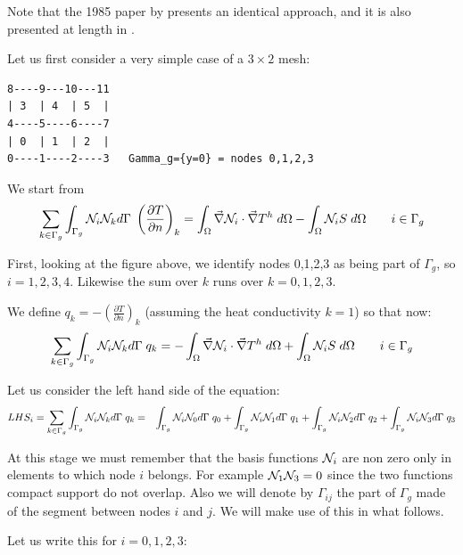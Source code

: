 Note that the 1985 paper by \textcite{cacs85} presents an identical approach, 
and it is also presented at length in \textcite{grls87}.

Let us first consider a very simple case of a $3\times 2$ mesh:

\begin{verbatim}
8----9---10---11
| 3  | 4  | 5  |
4----5----6----7
| 0  | 1  | 2  |
0----1----2----3   Gamma_g={y=0} = nodes 0,1,2,3
\end{verbatim}



We start from 
\begin{equation}
\sum_{k \in \Gamma_g} \int_{\Gamma_g} {\mathcal{N}}_i {\mathcal{N}}_k d\Gamma \; 
\left(
\frac{\partial T}{\partial n}
\right)_k
=
\int_\Omega \vec\nabla {\mathcal{N}}_i \cdot \vec\nabla T^h \; d\Omega
- \int_\Omega {\mathcal{N}}_i S \; d\Omega
\qquad
i \in \Gamma_g
\label{eq:mizu1}
\end{equation}

First, looking at the figure above, we identify nodes 0,1,2,3 as 
being part of $\Gamma_g$, so $i=1,2,3,4$. Likewise the sum over $k$ 
runs over $k=0,1,2,3$.

We define $q_k= -\left(\frac{\partial T}{\partial n}\right)_k$ 
(assuming the heat conductivity $k=1$) 
so that now:
\[
\sum_{k \in \Gamma_g} \int_{\Gamma_g} {\mathcal{N}}_i {\mathcal{N}}_k d\Gamma \; 
q_k
=
-\int_\Omega \vec\nabla {\mathcal{N}}_i \cdot \vec\nabla T^h \; d\Omega
+ \int_\Omega {\mathcal{N}}_i S \; d\Omega
\qquad
i \in \Gamma_g
\]


Let us consider the left hand side of the equation:
\begin{eqnarray}
LHS_i= \sum_{k \in \Gamma_g} \int_{\Gamma_g} {\mathcal{N}}_i {\mathcal{N}}_k d\Gamma \; q_k
&=&
\int_{\Gamma_g} {\mathcal{N}}_i {\mathcal{N}}_0 d\Gamma \; q_0 +
\int_{\Gamma_g} {\mathcal{N}}_i {\mathcal{N}}_1 d\Gamma \; q_1 +
\int_{\Gamma_g} {\mathcal{N}}_i {\mathcal{N}}_2 d\Gamma \; q_2 +
\int_{\Gamma_g} {\mathcal{N}}_i {\mathcal{N}}_3 d\Gamma \; q_3 \nonumber
\end{eqnarray}

At this stage we must remember that the basis functions ${\mathcal{N}}_i$ are non zero only
in elements to which node $i$ belongs. For example ${\mathcal{N}}_1{\mathcal{N}}_3=0$ since the two 
functions compact support do not overlap. 
Also we will denote by $\Gamma_{ij}$ the part of $\Gamma_g$ made of the segment
between nodes $i$ and $j$. We will make use of this in what follows.



Let us write this for $i=0,1,2,3$:

